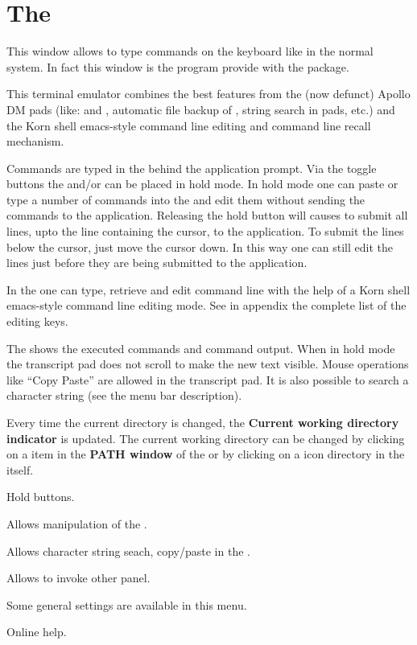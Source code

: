 \clearpage

\section{The \EW}


This window allows to type commands on the keyboard like in the normal \XPAW{}
system. In fact this window is the  program provide with the \KUIP{}
package.

This terminal emulator combines the best features from the (now defunct) Apollo
DM pads (like: \IP{} and \TP, automatic file backup of \TP, string search in 
pads, etc.) and the Korn shell emacs-style command line editing and command line
recall mechanism.

Commands are typed in the \IP{}  behind the application prompt. Via the
toggle buttons   the \IP{} and/or \TP{} can be placed in hold
mode. In hold mode one can paste or type a number of commands into the \IP{} and
edit them without sending the commands to the application. Releasing the hold 
button will causes  to submit all lines, upto the line containing 
the cursor, to the application. To submit the lines below the cursor, just move
the cursor down. In this way one can still edit the lines just before they are
being submitted to the application.


\begin{EnumZB}
\item In the \IP{} one can type, retrieve and edit command line with the help of
      a Korn shell emacs-style command line editing mode. See in appendix the 
      complete list of the editing keys.
\item The \TP{}  shows the executed commands and command output.
      When in hold mode  the transcript pad does not scroll to make 
      the new text
      visible. Mouse operations like ``Copy Paste'' are allowed in the 
      transcript pad. It is also possible to search a character string (see the
      menu bar description).
\item Every time the current directory is changed, the {\bf Current working 
      directory indicator} is updated. The current working directory can be 
      changed by clicking on a item in the {\bf PATH window} of the \MB{} or
      by clicking on a icon directory in the \MB{} itself.
\item Hold buttons.
\end{EnumZB}
\begin{EnumZW}
\item Allows manipulation of the \TP. 
\item Allows character string seach, copy/paste in the \TP.
\item Allows to invoke other panel. 
\item Some general settings are available in this menu. 
\item Online help.
\end{EnumZW}


